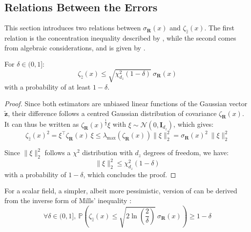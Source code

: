 \subsection{Relations Between the Errors}

This section introduces two relations between $\sigma_{\mathbf{R}}(x)$ and $\zeta_{\hat{z}}(x)$. The first relation is the concentration inequality described by , while the second comes from algebraic considerations, and is given by .

\begin{proposition}\label{th:concentration_inequality}
	For $\delta\in(0,1]$:
	\begin{equation}
		\zeta_{\hat{z}}(x)\leq\sqrt{\chi^2_{d_z}(1-\delta)}\:\sigma_{\mathbf{R}}(x)
	\end{equation}
	with a probability of at least $1-\delta$.
\end{proposition}

\begin{proof}
	Since both estimators are unbiased linear functions of the Gaussian vector $\tilde{\mathbf{z}}$, their difference follows a centred Gaussian distribution of covariance $\zeta_{\mathbf{R}}(x)$. It can thus be written as $\zeta_{\mathbf{R}}(x)^{\frac{1}{2}}\xi$ with $\xi\sim\mathcal{N}(0,\mathbf{I}_{d_z})$, which gives:
	\begin{equation}
		\zeta_{\hat{z}}(x)^2=\xi^\top \zeta_{\mathbf{R}}(x)\:\xi\leq\lambda_{\max}\left(\zeta_{\mathbf{R}}(x)\right)\|\xi\|_2^2=\sigma_{\mathbf{R}}(x)^2\:\|\xi\|_2^2
	\end{equation}

	Since $\|\xi\|_2^2$ follows a $\chi^2$ distribution with $d_z$ degrees of freedom, we have:
	\begin{equation}
		\|\xi\|_2^2\leq\chi^2_{d_z}(1-\delta)
	\end{equation}
	with a probability of $1-\delta$, which concludes the proof.
\end{proof}

\begin{remark}
	For a scalar field, a simpler, albeit more pessimistic, version of  can be derived from the inverse form of Mills' inequality \cite{bib:proba-course}:
	\begin{equation}
		\forall\delta\in(0,1],\:\mathbb{P}\left(\zeta_{\hat{z}}(x)\leq\sqrt{2\ln\left(\frac{2}{\delta}\right)}\:\sigma_{\mathbf{R}}(x)\right)\geq1-\delta
	\end{equation}
\end{remark}

